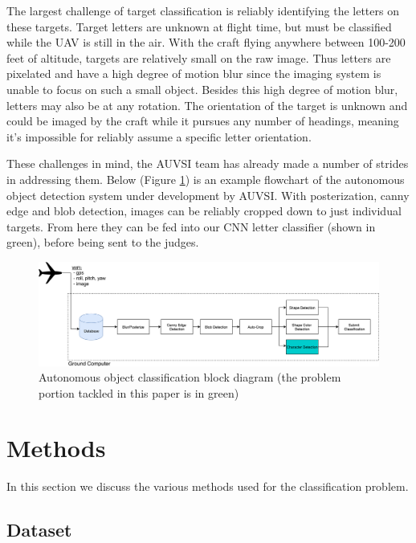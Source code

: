 \documentclass{article}
\begin{document}
The largest challenge of target classification is reliably identifying the letters on these targets. 
Target letters are unknown at flight time, but must be classified while the UAV is still in the air.
With the craft flying anywhere between 100-200 feet of altitude, targets are relatively small on the
raw image. Thus letters are pixelated and have a high degree of motion blur since the imaging system 
is unable to focus on such a small object. Besides this high degree of motion blur, letters may also 
be at any rotation. The orientation of the target is unknown and could be imaged by the craft while 
it pursues any number of headings, meaning it’s impossible for reliably assume a specific letter 
orientation.

These challenges in mind, the AUVSI team has already made a number of strides in addressing them. Below 
(Figure \ref{fig:imagingFlowchart}) is an example flowchart of the autonomous object detection system under development by AUVSI. With 
posterization, canny edge and blob detection, images can be reliably cropped down to just individual 
targets. From here they can be fed into our CNN letter classifier (shown in green), before being sent 
to the judges. 

\begin{figure}[H]
  \begin{center}
  \includegraphics[width=\linewidth]{./figs/auvsiImagingFlowchart.png}
  \caption{Autonomous object classification block diagram (the problem portion tackled in this paper is in green)}
  \label{fig:imagingFlowchart}
  \end{center}
\end{figure}

\section{Methods}

In this section we discuss the various methods used for the classification problem.

\subsection{Dataset}
\end{document}
